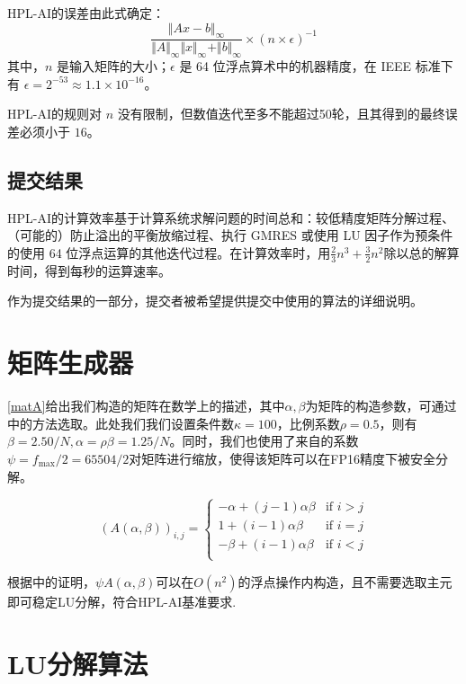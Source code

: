 HPL-AI的误差由此式确定：
$$
    \frac{\Vert Ax-b\Vert_{\infty}}{\Vert A\Vert_{\infty} \Vert x\Vert_{\infty} + \Vert b\Vert_{\infty}} \times (n \times \epsilon)^{-1}
$$
其中，$n$ 是输入矩阵的大小；$\epsilon$ 是 64 位浮点算术中的机器精度，在 IEEE 标准下有 $\epsilon=2^{−53}\approx 1.1\times 10^{-16}$。

HPL-AI的规则对 $n$ 没有限制，但数值迭代至多不能超过50轮，且其得到的最终误差必须小于 $16$。

\subsection{提交结果}

HPL-AI的计算效率基于计算系统求解问题的时间总和：较低精度矩阵分解过程、（可能的）防止溢出的平衡放缩过程、执行 GMRES 或使用 LU 因子作为预条件的使用 64 位浮点运算的其他迭代过程。在计算效率时，用$\frac{2}{3} n^3 + \frac{3}{2} n^2$除以总的解算时间，得到每秒的运算速率。

作为提交结果的一部分，提交者被希望提供提交中使用的算法的详细说明。

\section{矩阵生成器}

\autoref{matA}给出我们构造的矩阵在数学上的描述，其中$\alpha,\beta$为矩阵的构造参数，可通过\cite{2021Matrices}中的方法选取。此处我们我们设置条件数$\kappa=100$，比例系数$\rho=0.5$，则有$\beta=2.50/N,\alpha=\rho\beta=1.25/N$。同时，我们也使用了来自\cite{2021Matrices}的系数$\psi=f_{\max}/2=65504/2$对矩阵进行缩放，使得该矩阵可以在FP16精度下被安全分解。

\begin{equation}
    \left(A\left(\alpha,\beta\right)\right)_{i,j}=\begin{cases}
        -\alpha+\left(j-1\right)\alpha\beta & \text{if } i>j \\
        1+\left(i-1\right)\alpha\beta       & \text{if } i=j \\
        -\beta+\left(i-1\right)\alpha\beta  & \text{if } i<j \\
    \end{cases}\label{matA}
\end{equation}

根据\cite{2021Matrices}中的证明，$\psi A\left(\alpha,\beta\right)$可以在$O(n^2)$的浮点操作内构造，且不需要选取主元即可稳定LU分解，符合HPL-AI基准要求.

\section{LU分解算法}

